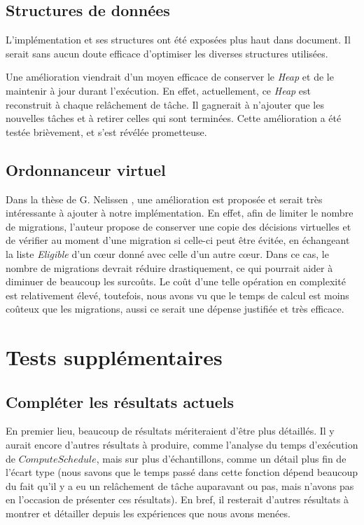 	\subsection{Structures de données}
		L'implémentation et ses structures ont été exposées plus haut dans document. 
		Il serait sans aucun doute efficace d'optimiser les diverses structures utilisées. \newline
		
		Une amélioration viendrait d'un moyen efficace de conserver le \textit{Heap} et de le maintenir 
		à jour durant l'exécution. En effet, actuellement, ce \textit{Heap} est reconstruit à chaque 
		relâchement de tâche. Il gagnerait à n'ajouter que les nouvelles tâches et à retirer celles qui sont terminées.
		Cette amélioration a été testée brièvement, et s'est révélée prometteuse.

	\subsection{Ordonnanceur virtuel}
	
		Dans la thèse de G. Nelissen \cite{nelissen_geoffrey_efficient_2013}, une amélioration est proposée et serait très intéressante 
		à ajouter à notre implémentation. En effet, afin de limiter le nombre de migrations, l'auteur propose de conserver une 
		copie des décisions \og{}virtuelles\fg{} et de vérifier au moment d'une migration si celle-ci peut être évitée, en 
		échangeant la liste \textit{Eligible} d'un cœur donné avec celle d'un autre cœur. Dans ce cas, le nombre de migrations devrait 
		réduire drastiquement, ce qui pourrait aider à diminuer de beaucoup les surcoûts.
		Le coût d'une telle opération en complexité est relativement élevé, toutefois, nous avons vu que le temps de calcul 
		est moins coûteux que les migrations, aussi ce serait une dépense justifiée et très efficace.

\section{Tests supplémentaires}

	\subsection{Compléter les résultats actuels}
	
	En premier lieu, beaucoup de résultats mériteraient d'être plus détaillés. Il y aurait encore d'autres résultats à produire, 
	comme l'analyse du temps d'exécution de $ComputeSchedule$, mais sur plus d'échantillons, comme un détail plus 
	fin de l'écart type (nous savons que le temps passé dans cette fonction dépend beaucoup du fait qu'il y a eu un relâchement 
	de tâche auparavant ou pas, mais n'avons pas en l'occasion de présenter ces résultats). En bref, il resterait d'autres résultats à 
	montrer et détailler depuis les expériences que nous avons menées. 


